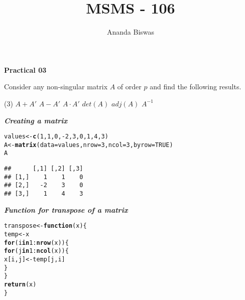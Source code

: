 \documentclass[11pt, a4paper]{article}\usepackage[]{graphicx}\usepackage[]{xcolor}
\title{MSMS - 106}
\author{Ananda Biswas}
\date{}
\makeatletter
\newcommand{\hlnum}[1]{\textcolor[rgb]{0.686,0.059,0.569}{#1}}%
\newcommand{\hlopt}[1]{\textcolor[rgb]{0,0,0}{#1}}%
\newcommand{\hldef}[1]{\textcolor[rgb]{0.345,0.345,0.345}{#1}}%
\newcommand{\hlkwa}[1]{\textcolor[rgb]{0.161,0.373,0.58}{\textbf{#1}}}%
\newcommand{\hlkwb}[1]{\textcolor[rgb]{0.69,0.353,0.396}{#1}}%
\newcommand{\hlkwc}[1]{\textcolor[rgb]{0.333,0.667,0.333}{#1}}%
\newcommand{\hlkwd}[1]{\textcolor[rgb]{0.737,0.353,0.396}{\textbf{#1}}}%
\newenvironment{kframe}{%
 \def\at@end@of@kframe{}%
 \ifinner\ifhmode%
  \def\at@end@of@kframe{\end{minipage}}%
  \begin{minipage}{\columnwidth}%
 \fi\fi%
 \def\FrameCommand##1{\hskip\@totalleftmargin \hskip-\fboxsep
 \colorbox{shadecolor}{##1}\hskip-\fboxsep
     \hskip-\linewidth \hskip-\@totalleftmargin \hskip\columnwidth}%
 \MakeFramed {\advance\hsize-\width
   \@totalleftmargin\z@ \linewidth\hsize
   \@setminipage}}%
 {\par\unskip\endMakeFramed%
 \at@end@of@kframe}
\newenvironment{knitrout}{}{} %
\makeatother
\begin{document}
\maketitle

\begin{center}
\textbf{Practical 03}
\end{center}


\smallpencil \hspace{0.5cm} Consider any non-singular matrix $A$ of order $p$ and find the following results.


\begin{tasks}(3)
  \task $A + A'$
  \task $A - A'$
  \task $A \cdot A'$
  \task $det(A)$
  \task $adj(A)$
  \task $A^{-1}$
\end{tasks}

\vspace{0.5cm}

\faArrowAltCircleRight[regular] \textit{\textbf{Creating a matrix}}

\begin{knitrout}
\color{fgcolor}\begin{kframe}
\begin{alltt}
\hldef{values} \hlkwb{<-} \hlkwd{c}\hldef{(}\hlnum{1}\hldef{,} \hlnum{1}\hldef{,} \hlnum{0}\hldef{,} \hlopt{-}\hlnum{2}\hldef{,} \hlnum{3}\hldef{,} \hlnum{0}\hldef{,} \hlnum{1}\hldef{,} \hlnum{4}\hldef{,} \hlnum{3}\hldef{)}
\hldef{A} \hlkwb{<-} \hlkwd{matrix}\hldef{(}\hlkwc{data} \hldef{= values,} \hlkwc{nrow} \hldef{=} \hlnum{3}\hldef{,} \hlkwc{ncol} \hldef{=} \hlnum{3}\hldef{,} \hlkwc{byrow} \hldef{=} \hlnum{TRUE}\hldef{)}
\hldef{A}
\end{alltt}
\begin{verbatim}
##      [,1] [,2] [,3]
## [1,]    1    1    0
## [2,]   -2    3    0
## [3,]    1    4    3
\end{verbatim}
\end{kframe}
\end{knitrout}

\faArrowAltCircleRight[regular] \textit{\textbf{Function for transpose of a matrix}}

\begin{knitrout}
\color{fgcolor}\begin{kframe}
\begin{alltt}
\hldef{transpose} \hlkwb{<-} \hlkwa{function}\hldef{(}\hlkwc{x}\hldef{)\{}
  \hldef{temp} \hlkwb{<-} \hldef{x}
  \hlkwa{for} \hldef{(i} \hlkwa{in} \hlnum{1}\hlopt{:}\hlkwd{nrow}\hldef{(x)) \{}
    \hlkwa{for} \hldef{(j} \hlkwa{in} \hlnum{1}\hlopt{:}\hlkwd{ncol}\hldef{(x)) \{}
      \hldef{x[i, j]} \hlkwb{<-} \hldef{temp[j, i]}
    \hldef{\}}
  \hldef{\}}
  \hlkwd{return}\hldef{(x)}
\hldef{\}}
\end{alltt}
\end{kframe}
\end{knitrout}
\end{document}
